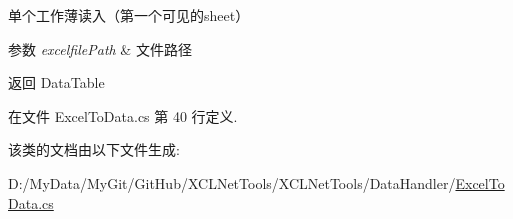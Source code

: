 单个工作薄读入（第一个可见的sheet） 
\begin{DoxyParams}{参数}
{\em excelfile\-Path} & 文件路径\\
\hline
\end{DoxyParams}
\begin{DoxyReturn}{返回}
Data\-Table
\end{DoxyReturn}




在文件 Excel\-To\-Data.\-cs 第 40 行定义.



该类的文档由以下文件生成\-:\begin{DoxyCompactItemize}
\item 
D\-:/\-My\-Data/\-My\-Git/\-Git\-Hub/\-X\-C\-L\-Net\-Tools/\-X\-C\-L\-Net\-Tools/\-Data\-Handler/\hyperlink{_excel_to_data_8cs}{Excel\-To\-Data.\-cs}\end{DoxyCompactItemize}
